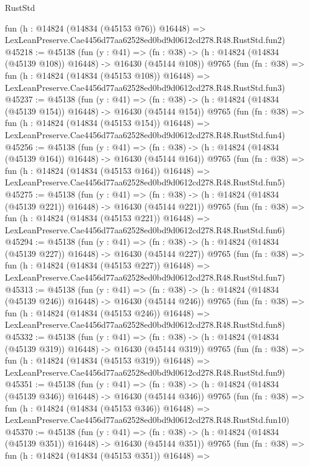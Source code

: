 \begin{lexlean}{RustStd}
\begin{coremodule}
    fun (h : @14824 (@14834 (@45153 @76)) @16448) =>
    LexLeanPreserve.Cae4456d77aa62528ed0bd9d0612cd278.R48.RustStd.fun2)
@45218 := @45138
    (fun (y : @41) =>
    (fn : @38) -> (h : @14824 (@14834 (@45139 @108)) @16448) -> @16430 (@45144 @108))
    @9765
    (fun (fn : @38) =>
    fun (h : @14824 (@14834 (@45153 @108)) @16448) =>
    LexLeanPreserve.Cae4456d77aa62528ed0bd9d0612cd278.R48.RustStd.fun3)
@45237 := @45138
    (fun (y : @41) =>
    (fn : @38) -> (h : @14824 (@14834 (@45139 @154)) @16448) -> @16430 (@45144 @154))
    @9765
    (fun (fn : @38) =>
    fun (h : @14824 (@14834 (@45153 @154)) @16448) =>
    LexLeanPreserve.Cae4456d77aa62528ed0bd9d0612cd278.R48.RustStd.fun4)
@45256 := @45138
    (fun (y : @41) =>
    (fn : @38) -> (h : @14824 (@14834 (@45139 @164)) @16448) -> @16430 (@45144 @164))
    @9765
    (fun (fn : @38) =>
    fun (h : @14824 (@14834 (@45153 @164)) @16448) =>
    LexLeanPreserve.Cae4456d77aa62528ed0bd9d0612cd278.R48.RustStd.fun5)
@45275 := @45138
    (fun (y : @41) =>
    (fn : @38) -> (h : @14824 (@14834 (@45139 @221)) @16448) -> @16430 (@45144 @221))
    @9765
    (fun (fn : @38) =>
    fun (h : @14824 (@14834 (@45153 @221)) @16448) =>
    LexLeanPreserve.Cae4456d77aa62528ed0bd9d0612cd278.R48.RustStd.fun6)
@45294 := @45138
    (fun (y : @41) =>
    (fn : @38) -> (h : @14824 (@14834 (@45139 @227)) @16448) -> @16430 (@45144 @227))
    @9765
    (fun (fn : @38) =>
    fun (h : @14824 (@14834 (@45153 @227)) @16448) =>
    LexLeanPreserve.Cae4456d77aa62528ed0bd9d0612cd278.R48.RustStd.fun7)
@45313 := @45138
    (fun (y : @41) =>
    (fn : @38) -> (h : @14824 (@14834 (@45139 @246)) @16448) -> @16430 (@45144 @246))
    @9765
    (fun (fn : @38) =>
    fun (h : @14824 (@14834 (@45153 @246)) @16448) =>
    LexLeanPreserve.Cae4456d77aa62528ed0bd9d0612cd278.R48.RustStd.fun8)
@45332 := @45138
    (fun (y : @41) =>
    (fn : @38) -> (h : @14824 (@14834 (@45139 @319)) @16448) -> @16430 (@45144 @319))
    @9765
    (fun (fn : @38) =>
    fun (h : @14824 (@14834 (@45153 @319)) @16448) =>
    LexLeanPreserve.Cae4456d77aa62528ed0bd9d0612cd278.R48.RustStd.fun9)
@45351 := @45138
    (fun (y : @41) =>
    (fn : @38) -> (h : @14824 (@14834 (@45139 @346)) @16448) -> @16430 (@45144 @346))
    @9765
    (fun (fn : @38) =>
    fun (h : @14824 (@14834 (@45153 @346)) @16448) =>
    LexLeanPreserve.Cae4456d77aa62528ed0bd9d0612cd278.R48.RustStd.fun10)
@45370 := @45138
    (fun (y : @41) =>
    (fn : @38) -> (h : @14824 (@14834 (@45139 @351)) @16448) -> @16430 (@45144 @351))
    @9765
    (fun (fn : @38) =>
    fun (h : @14824 (@14834 (@45153 @351)) @16448) =>

\end{coremodule}
\end{lexlean}
